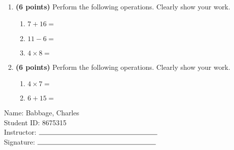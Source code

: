 \documentclass[12pt]{amsart}
\begin{document}
\newpage
\begin{enumerate}
\item {\bf (6 points)} 
 Perform the following operations. Clearly show your work. \begin{enumerate}


\def \a{7}\def \b{16}\def \apb{23}

 
\item $\a + \b = $

\vspace{2cm}
\def \a{11}\def \dif{5}\def \b{6}

 
\item $\a - \b = $

\vspace{2cm}
\def \a{4}\def \b{8}\def \ab{12}

 
\item $\a \times \b = $ 

\vspace{2cm}
\def \vshift{-1}\def \hshift{-2}\def \chang{1}\def \findval{-1}\def \yval{-3}

 
\end{enumerate}


\newpage
\item {\bf (6 points)} 
 Perform the following operations. Clearly show your work. \begin{enumerate}


\def \a{4}\def \b{7}\def \ab{11}

 
\item $\a \times \b = $ 

\vspace{2cm}
\def \a{6}\def \b{15}\def \apb{21}

 
\item $\a + \b = $

\vspace{2cm}
\def \vshift{3}\def \hshift{2}\def \chang{-2}\def \findval{0}\def \yval{7}

 
\end{enumerate}


\newpage\end{enumerate}\graphicspath{{/Users/jilan/Downloads/Randomizer/Randomizer/Sample Course/Sample Assessment 2/}}\setcounter{page}{1}


\thispagestyle{fancy}

 \noindent Name: Babbage, Charles \vspace{.3cm} \\\noindent Student ID: 8675315 \vspace{.3cm} \\\noindent Instructor: $\rule{6cm}{0.15mm}$ \vspace{.3cm} \\\noindent Signature: $\rule{6cm}{0.15mm}$ \vspace{.3cm} \\ 
\end{document}
